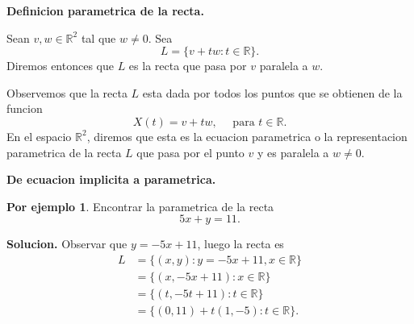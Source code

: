 \documentclass{article}
\theoremstyle{definition}
\theoremstyle{definition}
\newtheorem*{ej}{Por ejemplo}
\theoremstyle{remark}
\begin{document}
\begin{center}
\textbf{Definicion parametrica de la recta.}
\end{center}
\begin{defi}
  Sean $v,w \in \mathbb{R}^2$ tal que $w\neq 0$. Sea \[
    L=\{v+tw : t \in \mathbb{R}\}.
  \]
Diremos entonces que $L$ es la recta que pasa por $v$ paralela a $w$.
\end{defi}
Observemos que la recta $L$ esta dada por todos los puntos que se obtienen de la funcion \[
  X(t)=v+tw, \quad \text{ para } t \in \mathbb{R}.
\]
En el espacio $\mathbb{R}^2$, diremos que esta es la ecuacion parametrica o la representacion parametrica de la recta $L$ que pasa por el punto $v$ y es paralela a $w \neq 0$.
\begin{figure}[h]
\centering
\def\svgwidth{0.75\textwidth}

\end{figure}

\begin{center}
\textbf{De ecuacion implicita a parametrica.}
\end{center}
\begin{ej}
  Encontrar la parametrica de la recta \[
5x+y=11.
  \]
\end{ej}
\textbf{Solucion.}
Observar que $y=-5x+11$, luego la recta es \[
  \begin{aligned}
    L&=\big\{(x,y) : y=-5x+11, x \in \mathbb{R}\big\} \\
     &= \big\{(x,-5x+11) : x \in \mathbb{R}\big\} \\
     &= \big\{(t,-5t+11) : t \in \mathbb{R}\big\} \\
     &= \big\{(0,11)+t(1,-5) : t \in \mathbb{R}\big\}.
  \end{aligned}
\]
\pagebreak
\end{document}
